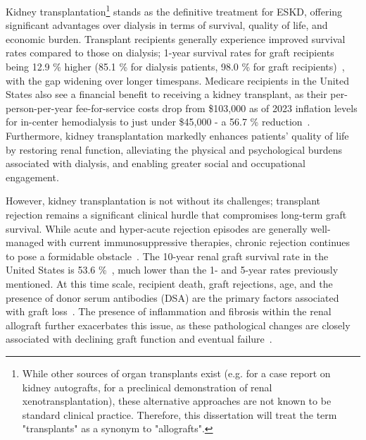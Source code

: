 Kidney transplantation\footnote{
    While other sources of organ transplants exist (e.g. \cite{artilesmedina_Kidney_2022} for a case report on kidney autografts, \cite{steadman_United_2025} for a preclinical demonstration of renal xenotransplantation), these alternative approaches are not known to be standard clinical practice. Therefore, this dissertation will treat the term "transplants" as a synonym to "allografts".
} stands as the definitive treatment for ESKD, offering significant advantages over dialysis in terms of survival, quality of life, and economic burden. Transplant recipients generally experience improved survival rates compared to those on dialysis; 1-year survival rates for graft recipients being 12.9 \% higher (85.1 \% for dialysis patients, 98.0 \% for graft recipients)~\cite{unitedstatesrenaldatasystem_USRDS_2025}, with the gap widening over longer timespans. Medicare recipients in the United States also see a financial benefit to receiving a kidney transplant, as their per-person-per-year fee-for-service costs drop from \$103,000 as of 2023 inflation levels for in-center hemodialysis to just under \$45,000 - a 56.7 \% reduction~\cite{unitedstatesrenaldatasystem_USRDS_2025}. Furthermore, kidney transplantation markedly enhances patients' quality of life by restoring renal function, alleviating the physical and psychological burdens associated with dialysis, and enabling greater social and occupational engagement.


However, kidney transplantation is not without its challenges; transplant rejection remains a significant clinical hurdle that compromises long-term graft survival. While acute and hyper-acute rejection episodes are generally well-managed with current immunosuppressive therapies, chronic rejection continues to pose a formidable obstacle~\cite{poggio_Longterm_2021}. The 10-year renal graft survival rate in the United States is 53.6 \%~\cite{hariharan_LongTerm_2021}, much lower than the 1- and 5-year rates previously mentioned. At this time scale, recipient death, graft rejections, age, and the presence of donor serum antibodies (DSA) are the primary factors associated with graft loss~\cite{unitedstatesrenaldatasystem_USRDS_2025,betjes_Causes_2022,el-zoghby_Identifying_2008,kanbay_metaanalysis_2025}. The presence of inflammation and fibrosis within the renal allograft further exacerbates this issue, as these pathological changes are closely associated with declining graft function and eventual failure~\cite{haas_Differences_2017,betjes_Causes_2022,gago_Kidney_2012,nankivell_Rejection_2010,saritas_Kidney_2021}.

